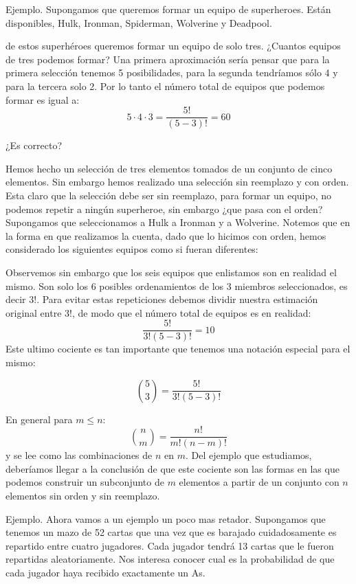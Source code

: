 \documentclass[14pt]{extreport}
\newcounter{ejemplo}[chapter]
\begin{document}
Ejemplo. Supongamos que queremos formar un equipo de superheroes. Están disponibles, Hulk, Ironman, Spiderman, Wolverine y Deadpool.

de estos superhéroes queremos formar un equipo de solo tres. ¿Cuantos equipos de tres podemos formar? Una primera aproximación sería pensar que para la primera selección tenemos 5 posibilidades, para la segunda tendríamos sólo 4 y para la tercera solo 2. Por lo tanto el número total de equipos que podemos formar es igual a:
$$
  5\cdot4\cdot3=\frac{5!}{(5 - 3)!} = 60
$$

\begin{center}
  ¿Es correcto?
\end{center}

Hemos hecho un selección de tres elementos tomados de un conjunto de cinco elementos. Sin embargo hemos realizado una selección sin reemplazo y con orden. Esta claro que la selección debe ser sin reemplazo, para formar un equipo, no podemos repetir a ningún superheroe, sin embargo ¿que pasa con el orden? Supongamos que seleccionamos a Hulk a Ironman y a Wolverine. Notemos que en la forma en que realizamos la cuenta, dado que lo hicimos con orden, hemos considerado los siguientes equipos como si fueran diferentes:

Observemos sin embargo que los seis equipos que enlistamos son en realidad el mismo. Son solo los 6 posibles ordenamientos de los 3 miembros seleccionados, es decir $3!$. Para evitar estas repeticiones debemos dividir nuestra estimación original entre $3!$, de modo que el número total de equipos es en realidad:
$$
  \frac{5!}{3!(5 - 3)!} = 10
$$
Este ultimo cociente es tan importante que tenemos una notación especial para el mismo:

$$
  \binom{5}{3}= \frac{5!}{3!(5 - 3)!}
$$

En general para $m \leq n$:
$$
  \binom{n}{m}=  \frac{n!}{m!(n - m)!}
$$
y se lee como las combinaciones de $n$ en $m$. Del ejemplo que estudiamos, deberíamos llegar a la conclusión de que este cociente son las formas en las que podemos construir un subconjunto de $m$ elementos a partir de un conjunto con $n$ elementos sin orden y sin reemplazo.

Ejemplo. Ahora vamos a un ejemplo un poco mas retador. Supongamos que tenemos un mazo de 52 cartas que una vez que es barajado cuidadosamente es repartido entre cuatro jugadores. Cada jugador tendrá 13 cartas que le fueron repartidas aleatoriamente. Nos interesa conocer cual es la probabilidad de que cada jugador haya recibido exactamente un As.
\end{document}
